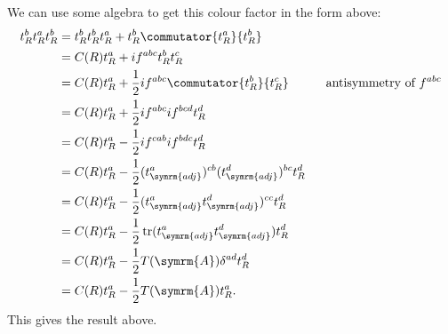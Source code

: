 \documentclass[fleqn]{NotesClass}
\DeclareMathOperator{\tr}{tr}
\newcommand{\adj}{\symrm{adj}}
\newcommand{\adjointRep}{\symrm{A}}
\begin{document}
    We can use some algebra to get this colour factor in the form above:
    \begin{align}
        t_R^b t_R^a t_R^b &= t_R^b t_R^b t_R^a + t_R^b \commutator{t_R^a}{t_R^b}\\
        &= C(R) t_R^a + if^{abc}t_R^b t_R^c\\
        &= C(R) t_R^a + \frac{1}{2}if^{abc}\commutator{t_R^b}{t_R^c} \qquad & \text{antisymmetry of }f^{abc}\\
        &= C(R) t_R^a + \frac{1}{2}if^{abc}if^{bcd}t_R^d\\
        &= C(R) t_R^a - \frac{1}{2}if^{cab}if^{bdc}t_R^d\\
        &= C(R) t_R^a - \frac{1}{2}(t_{\adj}^a)^{cb}(t_{\adj}^d)^{bc} t_R^d\\
        &= C(R) t_R^a - \frac{1}{2}(t_{\adj}^a t_{\adj}^d)^{cc} t_R^d\\
        &= C(R) t_R^a - \frac{1}{2}\tr(t_{\adj}^a t_{\adj}^d) t_R^d\\
        &= C(R) t_R^a - \frac{1}{2}T(\adjointRep)\delta^{ad} t_R^d\\
        &= C(R) t_R^a - \frac{1}{2}T(\adjointRep) t_R^a.
    \end{align}
    This gives the result above.
    
\end{document}
